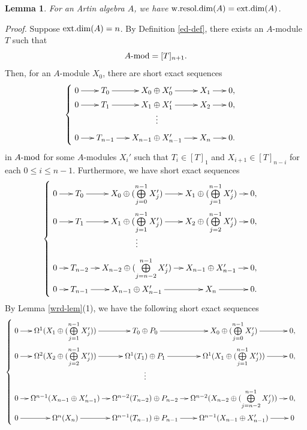 \documentclass[12pt]{article}
\numberwithin{equation}{section}
\newtheorem{Lem}[Def]{Lemma}
\theoremstyle{definition}
\def\ed{\mathop{\rm ext.dim}\nolimits}
\def\wrd{\mathop{\rm w.resol.dim}\nolimits}
\newcommand{\modcat}{\ensuremath{\mbox{{\rm -mod}}}}
\begin{document}
\begin{Lem}\label{wrd=ed}
For an Artin algebra $A$, we have $\wrd(A)=\ed(A)$.
\end{Lem}
{\it Proof.} Suppose $\ed(A)=n$. By Definition \ref{ed-def}, there exists an $A$-module $T$ such that $$A\modcat=[T]_{n+1}.$$
Then, for an $A$-module $X_0$, there are short exact sequences
\begin{equation*}
\begin{cases}
\xymatrix@C=1.5em@R=0.1em{
0\ar[r]& T_0\ar[r] & X_0\oplus X_{0}'\ar[r]& X_{1}\ar[r]&0,\\
0\ar[r]& T_1\ar[r] & X_{1}\oplus X_{1}'\ar[r]& X_{2}\ar[r]&0,\\
&&\vdots&&\\
0\ar[r]& T_{n-1}\ar[r] & X_{n-1}\oplus X_{n-1}'\ar[r]& X_{n}\ar[r]&0.
}
\end{cases}
\end{equation*}
in $A\modcat$ for some $A$-modules $X_i'$ such that $T_i\in [T]_1$ and $X_{i+1}\in [T]_{n-i}$ for each $0\le i\le n-1$. Furthermore, we have short exact sequences
\begin{equation*}
\begin{cases}
\xymatrix@C=1em@R=0.1em{
0\ar[r]& T_0\ar[r]& X_0\oplus (\bigoplus\limits_{j=0}^{n-1} X_j')\ar[r]& X_{1}\oplus (\bigoplus\limits_{j=1}^{n-1} X_j')\ar[r]& 0,\\
0\ar[r]& T_1\ar[r]& X_1\oplus (\bigoplus\limits_{j=1}^{n-1} X_j')\ar[r]& X_{2}\oplus (\bigoplus\limits_{j=2}^{n-1} X_j')\ar[r]& 0,\\
&&\vdots&&\\
0\ar[r]& T_{n-2}\ar[r]& X_{n-2}\oplus (\bigoplus\limits_{j=n-2}^{n-1} X_j')\ar[r]& X_{n-1}\oplus X_{n-1}'\ar[r]& 0,\\
0\ar[r]& T_{n-1}\ar[r]& X_{n-1}\oplus X_{n-1}'\ar[r]& X_{n}\ar[r]& 0.
}
\end{cases}
\end{equation*}
By Lemma \ref{wrd-lem}(1), we have the following short exact sequences
\begin{equation}\label{short-ed}
\begin{cases}
\xymatrix@C=1em@R=0.1em{
0\ar[r]& \Omega^1(X_{1}\oplus (\bigoplus\limits_{j=1}^{n-1} X_j'))\ar[r]& T_0\oplus P_0\ar[r]& X_0\oplus (\bigoplus\limits_{j=0}^{n-1} X_j')\ar[r]& 0,\\
0\ar[r]&\Omega^2(X_{2}\oplus (\bigoplus\limits_{j=2}^{n-1} X_j'))\ar[r]& \Omega^1(T_1\ar[r])\oplus P_1& \Omega^1(X_1\oplus (\bigoplus\limits_{j=1}^{n-1} X_j'))\ar[r]& 0,\\
&&\vdots&&\\
0\ar[r]&\Omega^{n-1}(X_{n-1}\oplus X_{n-1}')\ar[r]& \Omega^{n-2}(T_{n-2})\oplus P_{n-2}\ar[r]& \Omega^{n-2}(X_{n-2}\oplus (\bigoplus\limits_{j=n-2}^{n-1} X_j'))\ar[r]& 0,\\
0\ar[r]& \Omega^n(X_{n})\ar[r]& \Omega^{n-1}(T_{n-1})\oplus P_{n-1}\ar[r]& \Omega^{n-1}(X_{n-1}\oplus X_{n-1}')\ar[r]& 0
}
\end{cases}
\end{equation}
\end{document}

